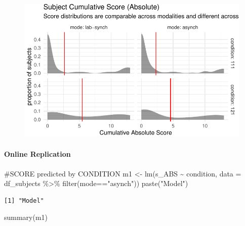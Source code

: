 \documentclass[
  letterpaper,
  DIV=11,
  numbers=noendperiod]{scrreprt}
\let\oldparagraph\paragraph
\renewcommand{\paragraph}[1]{\oldparagraph{#1}\mbox{}}
\newenvironment{Shaded}{\begin{snugshade}}{\end{snugshade}}
\newcommand{\AttributeTok}[1]{\textcolor[rgb]{0.40,0.45,0.13}{#1}}
\newcommand{\CommentTok}[1]{\textcolor[rgb]{0.37,0.37,0.37}{#1}}
\newcommand{\FunctionTok}[1]{\textcolor[rgb]{0.28,0.35,0.67}{#1}}
\newcommand{\NormalTok}[1]{\textcolor[rgb]{0.00,0.23,0.31}{#1}}
\newcommand{\OtherTok}[1]{\textcolor[rgb]{0.00,0.23,0.31}{#1}}
\newcommand{\SpecialCharTok}[1]{\textcolor[rgb]{0.37,0.37,0.37}{#1}}
\newcommand{\StringTok}[1]{\textcolor[rgb]{0.13,0.47,0.30}{#1}}
\begin{document}
\begin{figure}[H]

{\centering \includegraphics{analysis/SGC3A/4_sgc3A_hypotesting_files/figure-pdf/unnamed-chunk-6-1.pdf}

}

\end{figure}

\hypertarget{online-replication}{%
\paragraph{Online Replication}\label{online-replication}}

\begin{Shaded}
\begin{Highlighting}[]
\CommentTok{\#SCORE predicted by CONDITION}
\NormalTok{m1 }\OtherTok{\textless{}{-}} \FunctionTok{lm}\NormalTok{(s\_ABS }\SpecialCharTok{\textasciitilde{}}\NormalTok{ condition, }\AttributeTok{data =}\NormalTok{ df\_subjects }\SpecialCharTok{\%\textgreater{}\%} \FunctionTok{filter}\NormalTok{(mode}\SpecialCharTok{==}\StringTok{"asynch"}\NormalTok{))}
\FunctionTok{paste}\NormalTok{(}\StringTok{"Model"}\NormalTok{)}
\end{Highlighting}
\end{Shaded}

\begin{verbatim}
[1] "Model"
\end{verbatim}

\begin{Shaded}
\begin{Highlighting}[]
\FunctionTok{summary}\NormalTok{(m1)}
\end{Highlighting}
\end{Shaded}
\end{document}
